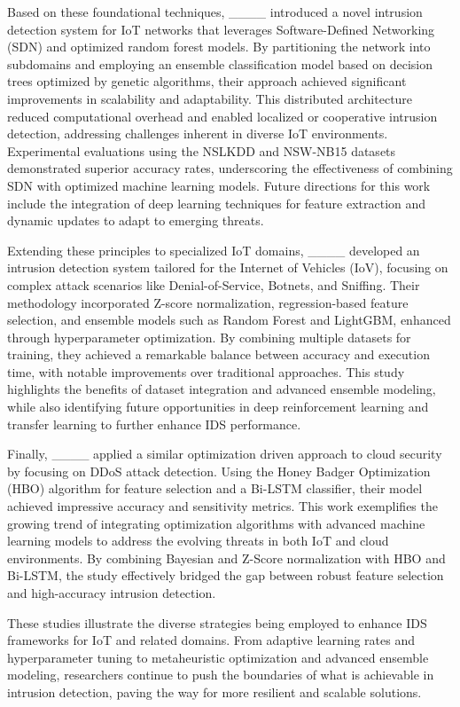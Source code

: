 Based on these foundational techniques, ____ introduced a novel intrusion detection system for IoT networks that leverages Software-Defined Networking (SDN) and optimized random forest models. By partitioning the network into subdomains and employing an ensemble classification model based on decision trees optimized by genetic algorithms, their approach achieved significant improvements in scalability and adaptability. This distributed architecture reduced computational overhead and enabled localized or cooperative intrusion detection, addressing challenges inherent in diverse IoT environments. Experimental evaluations using the NSLKDD and NSW-NB15 datasets demonstrated superior accuracy rates, underscoring the effectiveness of combining SDN with optimized machine learning models. Future directions for this work include the integration of deep learning techniques for feature extraction and dynamic updates to adapt to emerging threats.

Extending these principles to specialized IoT domains, ____ developed an intrusion detection system tailored for the Internet of Vehicles (IoV), focusing on complex attack scenarios like Denial-of-Service, Botnets, and Sniffing. Their methodology incorporated Z-score normalization, regression-based feature selection, and ensemble models such as Random Forest and LightGBM, enhanced through hyperparameter optimization. By combining multiple datasets for training, they achieved a remarkable balance between accuracy and execution time, with notable improvements over traditional approaches. This study highlights the benefits of dataset integration and advanced ensemble modeling, while also identifying future opportunities in deep reinforcement learning and transfer learning to further enhance IDS performance.

Finally, ____ applied a similar optimization driven approach to cloud security by focusing on DDoS attack detection. Using the Honey Badger Optimization (HBO) algorithm for feature selection and a Bi-LSTM classifier, their model achieved impressive accuracy and sensitivity metrics. This work exemplifies the growing trend of integrating optimization algorithms with advanced machine learning models to address the evolving threats in both IoT and cloud environments. By combining Bayesian and Z-Score normalization with HBO and Bi-LSTM, the study effectively bridged the gap between robust feature selection and high-accuracy intrusion detection.

These studies illustrate the diverse strategies being employed to enhance IDS frameworks for IoT and related domains. From adaptive learning rates and hyperparameter tuning to metaheuristic optimization and advanced ensemble modeling, researchers continue to push the boundaries of what is achievable in intrusion detection, paving the way for more resilient and scalable solutions.

